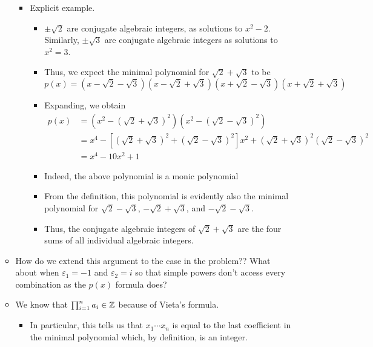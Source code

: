 \documentclass[../notes.tex]{subfiles}
\begin{document}
\begin{itemize}
\begin{itemize}
\begin{itemize}
            \item Explicit example.
            \begin{itemize}
                \item $\pm\sqrt{2}$ are conjugate algebraic integers, as solutions to $x^2-2$. Similarly, $\pm\sqrt{3}$ are conjugate algebraic integers as solutions to $x^2=3$.
                \item Thus, we expect the minimal polynomial for $\sqrt{2}+\sqrt{3}$ to be
                \begin{equation*}
                    p(x) = (x-\sqrt{2}-\sqrt{3})(x-\sqrt{2}+\sqrt{3})(x+\sqrt{2}-\sqrt{3})(x+\sqrt{2}+\sqrt{3})
                \end{equation*}
                \item Expanding, we obtain 
                \begin{align*}
                    p(x) &= (x^2-(\sqrt{2}+\sqrt{3})^2)(x^2-(\sqrt{2}-\sqrt{3})^2)\\
                    &= x^4-[(\sqrt{2}+\sqrt{3})^2+(\sqrt{2}-\sqrt{3})^2]x^2+(\sqrt{2}+\sqrt{3})^2(\sqrt{2}-\sqrt{3})^2\\
                    &= x^4-10x^2+1
                \end{align*}
                \item Indeed, the above polynomial is a monic polynomial 
                \item From the definition, this polynomial is evidently also the minimal polynomial for $\sqrt{2}-\sqrt{3}$, $-\sqrt{2}+\sqrt{3}$, and $-\sqrt{2}-\sqrt{3}$.
                \item Thus, the conjugate algebraic integers of $\sqrt{2}+\sqrt{3}$ are the four sums of all individual algebraic integers.
            \end{itemize}
        \end{itemize}
        \item How do we extend this argument to the case in the problem?? What about when $\varepsilon_1=-1$ and $\varepsilon_2=i$ so that simple powers don't access every combination as the $p(x)$ formula does?
        \item We know that $\prod_{i=1}^na_i\in\mathbb{Z}$ because of Vieta's formula.
        \begin{itemize}
            \item In particular, this tells us that $x_1\cdots x_n$ is equal to the last coefficient in the minimal polynomial which, by definition, is an integer.
        \end{itemize}

\end{itemize}
\end{itemize}
\end{document}
